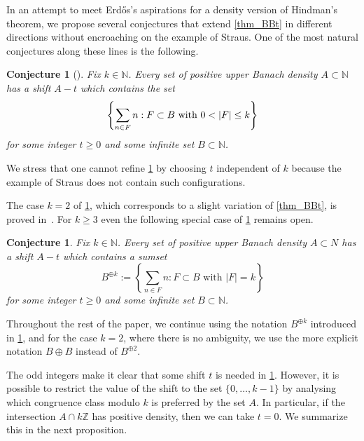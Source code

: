 \documentclass[10pt,dvipsnames]{article}
\newtheorem{conjecture}[theorem]{Conjecture}
\theoremstyle{definition}
\theoremstyle{plain}
\newcommand{\Z}{\mathbb{Z}}
\newcommand{\N}{\mathbb{N}}
\newcommand{\Erdos}{Erd\H{o}s}
\begin{document}
In an attempt to meet \Erdos{}'s aspirations for a density version of Hindman's theorem, we propose several conjectures that extend \cref{thm_BBt} in different directions without encroaching on the example of Straus. 
One of the most natural conjectures along these lines is the following.

\begin{conjecture}[{\cite[Conjecture~1.5]{KMRR2}}]
\label{q:bbtbbbtbbbbt}
Fix $k \in \N$.
Every set of positive upper Banach density $A\subset \N$ has a shift $A-t$ which contains the set 
\[\left\{ \sum_{n \in F}  n :   F \subset B\textup{ with } 0< |F| \leq k \right\}\]
for some integer $t\ge 0$ and some infinite set $B \subset \N$.
\end{conjecture}

We stress that one cannot refine \cref{q:bbtbbbtbbbbt} by choosing $t$ independent of $k$ because the example of Straus does not contain such configurations.

The case $k=2$ of \cref{q:bbtbbbtbbbbt}, which corresponds to a slight variation of \cref{thm_BBt}, is proved in~\cite[Theorem 1.2, part (ii)]{KMRR2}.
For $k\geq 3$ even the following special case of \cref{q:bbtbbbtbbbbt} remains open. 
\begin{conjecture}
\label{conj:bbbt}
Fix $k \in \N$.
Every set of positive upper Banach density $A\subset N$ has a shift $A-t$ which contains a sumset
\begin{equation}
\label{eqn:BBBBBB}
B^{\oplus k}:=\left\{\sum_{n\in F}n:F\subset B\text{ with }|F|=k\right\}
\end{equation}
for some integer $t \ge 0$ and some infinite set $B \subset \N$.
\end{conjecture}


Throughout the rest of the paper, we  continue using the notation $B^{\oplus k}$ introduced in \cref{conj:bbbt}, and for the case $k=2$, where there is no ambiguity, we use the more explicit notation $B \oplus B$ instead of  $B^{\oplus 2}$.

The odd integers make it clear that some shift $t$ is needed in \cref{conj:bbbt}. 
However, it is possible to restrict the value of the shift to the set $\{0,\dots, k-1\}$ by analysing which congruence class modulo $k$ is preferred by the set $A$. In particular, if the intersection $A\cap k\Z$ has positive density, then we can take $t=0$.  We summarize this in the next proposition. 
\end{document}

